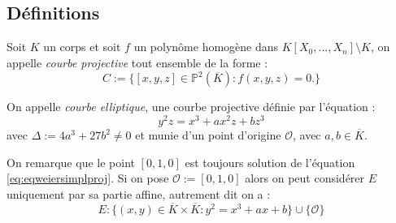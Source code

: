 \documentclass[a4paper]{article} %
\numberwithin{section}{part}
\numberwithin{equation}{section}
\newcommand\EO{\mathcal{O}}
\newcommand\PP[1]{\mathbb{P}^{#1}}
\begin{document}
\subsection{Définitions}
Soit $K$ un corps et soit $f$ un polynôme homogène dans
$K[X_0,\dots,X_n]\setminus K$, 
on appelle \emph{courbe projective} tout ensemble de la forme :
\begin{equation}
C := \lbrace{[x,y,z]\in \PP{2}(\overline{K}) : f(x,y,z) = 0}.\rbrace
\end{equation}
\begin{defn}
On appelle \emph{courbe elliptique}, une courbe projective définie par 
l'équation :
\begin{equation}
\label{eq:eqweiersimplproj}
y^2z = x^3 + ax^2z + bz^3
\end{equation}
avec $\Delta := 4a^3 + 27b^2\neq0$ et munie d'un point d'origine $\EO$, avec
$a,b\in\overline{K}$.
\end{defn}
\begin{rem}
On remarque que le point $[0,1,0]$ est toujours solution de l'équation
\ref{eq:eqweiersimplproj}. Si on pose $\EO := [0,1,0]$ alors on peut considérer
$E$ uniquement par sa partie affine, autrement dit on a :
\begin{equation}
\label{eq:weiersimpl}
E : \lbrace{(x,y)\in\overline{K}\times\overline{K} : y^2 = x^3 + ax + b}\rbrace
\cup\lbrace{\EO}\rbrace
\end{equation}
\end{rem}
\end{document}
